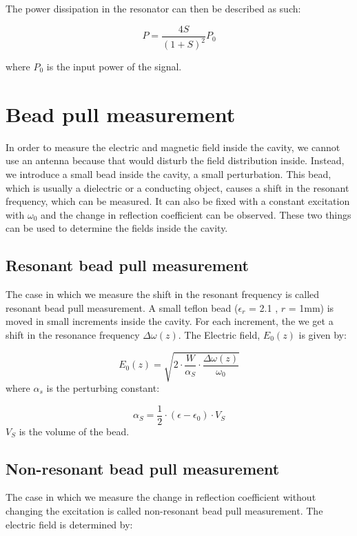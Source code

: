 \documentclass[a4paper]{report}
\numberwithin{equation}{section}
\begin{document}
The power dissipation in the resonator can then be described as such: 

\begin{equation} \label{eqn:power_loss}
	P = \frac{4S}{(1 + S)^2} P_0
\end{equation}

where $P_0$ is the input power of the signal. 

\section{Bead pull measurement}
In order to measure the electric and magnetic field inside the cavity, we cannot use an antenna because that would disturb the field distribution inside. Instead, we introduce a small bead inside the cavity, a small perturbation. This bead, which is usually a dielectric or a conducting object, causes a shift in the resonant frequency, which can be measured. It can also be fixed with a constant excitation with $\omega_{0}$ and the change in reflection coefficient can be observed. These two things can be used to determine the fields inside the cavity. 

\subsection{Resonant bead pull measurement}
The case in which we measure the shift in the resonant frequency is called resonant bead pull measurement. A small teflon bead ($\epsilon_{r}$ = 2.1 , $r$ = 1mm) is moved in small increments inside the cavity. For each increment, the we get a shift in the resonance frequency $\Delta \omega(z)$. The Electric field, $E_{0}(z)$ is given by:

\begin{equation} \label{eqn:E0_res}
		E_{0}(z) = \sqrt{2 \cdot \frac{W}{\alpha_{S}}\cdot \frac{\Delta \omega(z)}{\omega_{0}}}
\end{equation}
where $\alpha_{s}$ is the perturbing constant: 

\[
		\alpha_{S} = \frac{1}{2} \cdot (\epsilon - \epsilon_{0}) \cdot V_{S}
\]
$V_{S}$ is the volume of the bead. 

\subsection{Non-resonant bead pull measurement}
The case in which we measure the change in reflection coefficient without changing the excitation is called non-resonant bead pull measurement. The electric field is determined by: 
\end{document}
